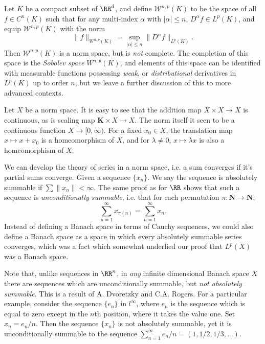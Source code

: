 \begin{example}
    Let $K$ be a compact subset of $\RR^d$, and define $\mathcal{W}^{n,p}(K)$ to be the space of all $f \in C^n(K)$ such that for any multi-index $\alpha$ with $|\alpha| \leq n$, $D^\alpha f \in L^p(K)$, and equip $\mathcal{W}^{n,p}(K)$ with the norm
    \[ \| f \|_{W^{n,p}(K)} = \sup_{|\alpha| \leq n} \| D^\alpha f \|_{L^p(K)}. \]
    Then $\mathcal{W}^{n,p}(K)$ is a norm space, but is \emph{not} complete. The completion of this space is the \emph{Sobolev space} $W^{n,p}(K)$, and elements of this space can be identified with measurable functions possessing \emph{weak}, or \emph{distributional} derivatives in $L^p(K)$ up to order $n$, but we leave a further discussion of this to more advanced contexts.
\end{example}

Let $X$ be a norm space. It is easy to see that the addition map $X \times X \to X$ is continuous, as is scaling map $\mathbf{K} \times X \to X$. The norm itself it seen to be a continuous function $X \to [0,\infty)$. For a fixed $x_0 \in X$, the translation map $x \mapsto x + x_0$ is a homeomorphism of $X$, and for $\lambda \neq 0$, $x \mapsto \lambda x$ is also a homeomorphism of $X$.

We can develop the theory of series in a norm space, i.e. a sum converges if it's partial sums converge. Given a sequence $\{ x_n \}$. We say the sequence is absolutely summable if $\sum \| x_n \| < \infty$. The same proof as for $\RR$ shows that such a sequence is {\it unconditionally summable}, i.e. that for each permutation $\pi: \mathbf{N} \to \mathbf{N}$,
%
\[ \sum_{n = 1}^\infty x_{\pi(n)} = \sum_{n = 1}^\infty x_n. \]
%
Instead of defining a Banach space in terms of Cauchy sequences, we could also define a Banach space as a space in which every absolutely summable series converges, which was a fact which somewhat underlied our proof that $L^p(X)$ was a Banach space.

\begin{remark}
    Note that, unlike sequences in $\RR^n$, in \emph{any} infinite dimensional Banach space $X$ there are sequences which are unconditionally summable, but \emph{not absolutely summable}. This is a result of A. Dvoretzky and C.A. Rogers. For a particular example, consider the sequence $\{ e_n \}$ in $l^\infty$, where $e_n$ is the sequence which is equal to zero except in the $n$th position, where it takes the value one. Set $x_n = e_n / n$. Then the sequence $\{ x_n \}$ is not absolutely summable, yet it is unconditionally summable to the sequence $\sum_{n = 1}^\infty e_n / n = (1,1/2,1/3,\dots)$.
\end{remark}

